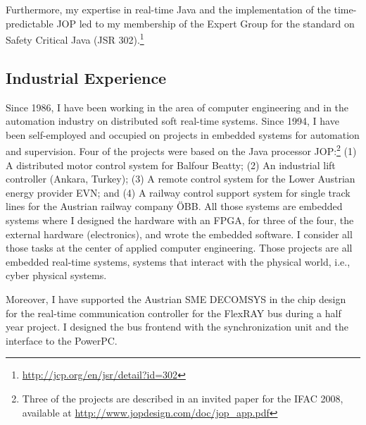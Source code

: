 \documentclass[%
    a4paper,
    11pt, %
    headinclude, footexclude,
    notitlepage,
    headsepline,
    pointlessnumbers,
    ]{scrartcl}
\begin{document}
Furthermore, my expertise in real-time Java and the implementation of
the time-predictable JOP led to my membership of the Expert Group for
the standard on Safety Critical Java (JSR
302).\footnote{\url{http://jcp.org/en/jsr/detail?id=302}}



\subsection*{Industrial Experience}

Since 1986, I have been working in the area of computer engineering
and in the automation industry on distributed soft real-time systems.
Since 1994, I have been self-employed and occupied on projects in
embedded systems for automation and supervision. Four of the projects
were based on the Java processor JOP:\footnote{Three of the projects
are described in an invited paper for the IFAC 2008, available at
\url{http://www.jopdesign.com/doc/jop_app.pdf}} (1) A distributed
motor control system for Balfour Beatty; (2) An industrial lift
controller (Ankara, Turkey); (3) A remote control system for the
Lower Austrian energy provider EVN; and (4) A railway control support
system for single track lines for the Austrian railway company \"OBB.
All those systems are embedded systems where I designed the hardware
with an FPGA, for three of the four, the external hardware (electronics),
and wrote the embedded software. I consider all those tasks at the center
of applied computer engineering.
Those projects are all embedded real-time systems, systems that
interact with the physical world, i.e., cyber physical systems.

Moreover, I have supported the Austrian SME DECOMSYS in the chip
design for the real-time communication controller for the FlexRAY bus
during a half year project.
I designed the bus frontend with the synchronization unit and the
interface to the PowerPC.
\end{document}
